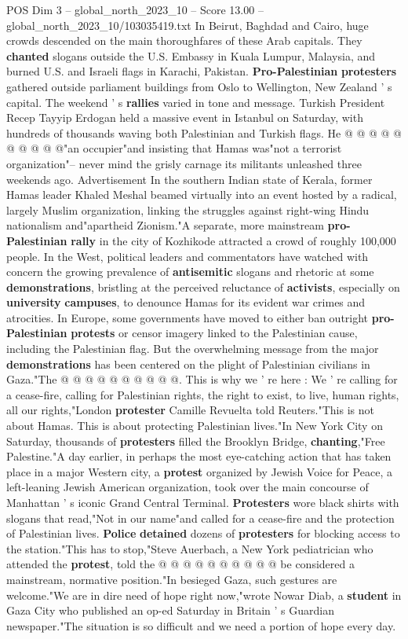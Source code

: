\begin{textsample}{POS Dim 3 – global\_north\_2023\_10 – Score 13.00 – global\_north\_2023\_10/103035419.txt}
In Beirut, Baghdad and Cairo, huge crowds descended on the main thoroughfares of these Arab capitals.
They \textbf{chanted} slogans outside the U.S.
Embassy in Kuala Lumpur, Malaysia, and burned U.S. and Israeli flags in Karachi, Pakistan. \textbf{Pro-Palestinian} \textbf{protesters} gathered outside parliament buildings from Oslo to Wellington, New Zealand ' s capital.
The weekend ' s \textbf{rallies} varied in tone and message.
Turkish President Recep Tayyip Erdogan held a massive event in Istanbul on Saturday, with hundreds of thousands waving both Palestinian and Turkish flags.
He @ @ @ @ @ @ @ @ @ @"an occupier"and insisting that Hamas was"not a terrorist organization"-- never mind the grisly carnage its militants unleashed three weekends ago.
Advertisement In the southern Indian state of Kerala, former Hamas leader Khaled Meshal beamed virtually into an event hosted by a radical, largely Muslim organization, linking the struggles against right-wing Hindu nationalism and"apartheid Zionism."A separate, more mainstream \textbf{pro-Palestinian} \textbf{rally} in the city of Kozhikode attracted a crowd of roughly 100,000 people.
In the West, political leaders and commentators have watched with concern the growing prevalence of \textbf{antisemitic} slogans and rhetoric at some \textbf{demonstrations}, bristling at the perceived reluctance of \textbf{activists}, especially on \textbf{university} \textbf{campuses}, to denounce Hamas for its evident war crimes and atrocities.
In Europe, some governments have moved to either ban outright \textbf{pro-Palestinian} \textbf{protests} or censor imagery linked to the Palestinian cause, including the Palestinian flag.
But the overwhelming message from the major \textbf{demonstrations} has been centered on the plight of Palestinian civilians in Gaza."The @ @ @ @ @ @ @ @ @ @.
This is why we ' re here : We ' re calling for a cease-fire, calling for Palestinian rights, the right to exist, to live, human rights, all our rights,"London \textbf{protester} Camille Revuelta told Reuters."This is not about Hamas.
This is about protecting Palestinian lives."In New York City on Saturday, thousands of \textbf{protesters} filled the Brooklyn Bridge, \textbf{chanting},"Free Palestine."A day earlier, in perhaps the most eye-catching action that has taken place in a major Western city, a \textbf{protest} organized by Jewish Voice for Peace, a left-leaning Jewish American organization, took over the main concourse of Manhattan ' s iconic Grand Central Terminal. \textbf{Protesters} wore black shirts with slogans that read,"Not in our name"and called for a cease-fire and the protection of Palestinian lives. \textbf{Police} \textbf{detained} dozens of \textbf{protesters} for blocking access to the station."This has to stop,"Steve Auerbach, a New York pediatrician who attended the \textbf{protest}, told the @ @ @ @ @ @ @ @ @ @ be considered a mainstream, normative position."In besieged Gaza, such gestures are welcome."We are in dire need of hope right now,"wrote Nowar Diab, a \textbf{student} in Gaza City who published an op-ed Saturday in Britain ' s Guardian newspaper."The situation is so difficult and we need a portion of hope every day.

\end{textsample}
